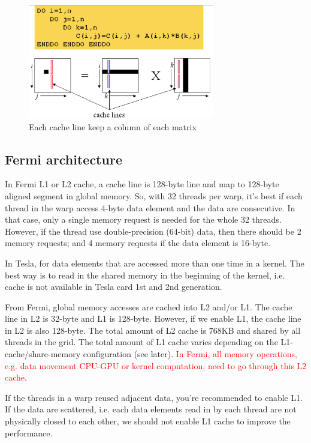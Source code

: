 \begin{figure}[hbt]
  \centerline{\includegraphics[height=5cm,
    angle=0]{./images/cache_line_ex1.eps}}
  \caption{Each cache line keep a column of each matrix}
  \label{fig:cache_line}
\end{figure}

\subsection{Fermi architecture}
\label{sec:shared-memory-cache}

In Fermi L1 or L2 cache, a cache line is 128-byte line and map to
128-byte aligned segment in global memory. So, with 32 threads per
warp, it's best if each thread in the warp access 4-byte data element
and the data are consecutive. In that case, only a single memory
request is needed for the whole 32 threads. However, if the thread use
double-precision (64-bit) data, then there should be 2 memory
requests; and 4 memory requests if the data element is 16-byte.

In Tesla, for data elements that are accessed more than one time in
a kernel. The best way is to read in the shared memory in the
beginning of the kernel, i.e. cache is not available in Tesla card
1st and 2nd generation. 

From Fermi, global memory accesses are cached into L2 and/or L1.  The
cache line in L2 is 32-byte and L1 is 128-byte. However, if we enable
L1, the cache line in L2 is also 128-byte. The total amount of L2
cache is 768KB and shared by all threads in the grid. The total amount
of L1 cache varies depending on the L1-cache/share-memory
configuration (see later).
\textcolor{red}{In Fermi, all memory operations, e.g. data movement
  CPU-GPU or kernel computation, need to go through this L2 cache}.


If the threads in a warp reused adjacent data, you're recommended to
enable L1. If the data are scattered, i.e. each data elements read
in by each thread are not physically closed to each other, we should
not enable L1 cache to improve the performance. 

